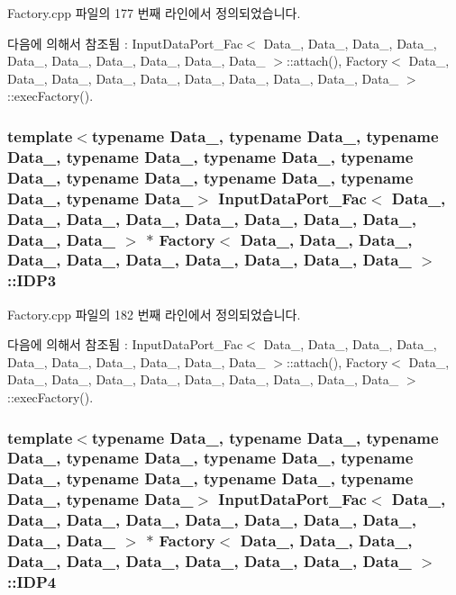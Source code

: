 Factory.\+cpp 파일의 177 번째 라인에서 정의되었습니다.



다음에 의해서 참조됨 \+:  Input\+Data\+Port\+\_\+\+Fac$<$ Data\+\_, Data\+\_, Data\+\_, Data\+\_, Data\+\_, Data\+\_, Data\+\_, Data\+\_, Data\+\_, Data\+\_ $>$\+::attach(), Factory$<$ Data\+\_, Data\+\_, Data\+\_, Data\+\_, Data\+\_, Data\+\_, Data\+\_, Data\+\_, Data\+\_, Data\+\_ $>$\+::exec\+Factory().

\subsubsection[{\texorpdfstring{I\+D\+P3}{IDP3}}]{\setlength{\rightskip}{0pt plus 5cm}template$<$typename Data\+\_, typename Data\+\_, typename Data\+\_, typename Data\+\_, typename Data\+\_, typename Data\+\_, typename Data\+\_, typename Data\+\_, typename Data\+\_, typename Data\+\_$>$ {\bf Input\+Data\+Port\+\_\+\+Fac}$<$ Data\+\_, Data\+\_, Data\+\_, Data\+\_, Data\+\_, Data\+\_, Data\+\_, Data\+\_, Data\+\_, Data\+\_ $>$ $\ast$ {\bf Factory}$<$ Data\+\_, Data\+\_, Data\+\_, Data\+\_, Data\+\_, Data\+\_, Data\+\_, Data\+\_, Data\+\_, Data\+\_ $>$\+::I\+D\+P3}\hypertarget{classFactory_a67c4448f7c694be4e12739d2d3cd7910}{}\label{classFactory_a67c4448f7c694be4e12739d2d3cd7910}


Factory.\+cpp 파일의 182 번째 라인에서 정의되었습니다.



다음에 의해서 참조됨 \+:  Input\+Data\+Port\+\_\+\+Fac$<$ Data\+\_, Data\+\_, Data\+\_, Data\+\_, Data\+\_, Data\+\_, Data\+\_, Data\+\_, Data\+\_, Data\+\_ $>$\+::attach(), Factory$<$ Data\+\_, Data\+\_, Data\+\_, Data\+\_, Data\+\_, Data\+\_, Data\+\_, Data\+\_, Data\+\_, Data\+\_ $>$\+::exec\+Factory().

\subsubsection[{\texorpdfstring{I\+D\+P4}{IDP4}}]{\setlength{\rightskip}{0pt plus 5cm}template$<$typename Data\+\_, typename Data\+\_, typename Data\+\_, typename Data\+\_, typename Data\+\_, typename Data\+\_, typename Data\+\_, typename Data\+\_, typename Data\+\_, typename Data\+\_$>$ {\bf Input\+Data\+Port\+\_\+\+Fac}$<$ Data\+\_, Data\+\_, Data\+\_, Data\+\_, Data\+\_, Data\+\_, Data\+\_, Data\+\_, Data\+\_, Data\+\_ $>$ $\ast$ {\bf Factory}$<$ Data\+\_, Data\+\_, Data\+\_, Data\+\_, Data\+\_, Data\+\_, Data\+\_, Data\+\_, Data\+\_, Data\+\_ $>$\+::I\+D\+P4}\hypertarget{classFactory_a965146b854acde70e6a7ca1095e44526}{}\label{classFactory_a965146b854acde70e6a7ca1095e44526}


